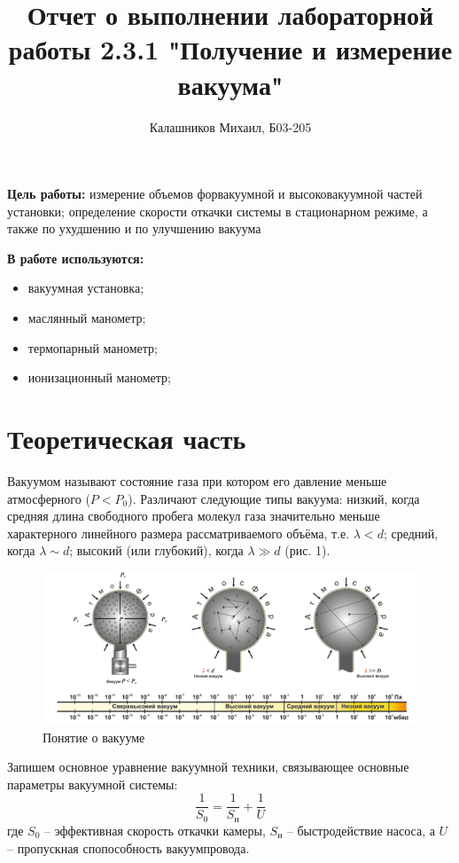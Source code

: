 \documentclass[14pt, a4paper]{report}
\title{\textbf{Отчет о выполнении лабораторной работы 2.3.1 "Получение и измерение вакуума"}}
\author{Калашников Михаил, Б03-205}
\date{}
\begin{document}
\maketitle

\textbf{Цель работы:}
измерение объемов форвакуумной и высоковакуумной частей установки; определение скорости откачки системы в стационарном режиме, а также по ухудшению и по улучшению вакуума
\newline

\textbf{В работе используются:}
\begin{itemize}
\item вакуумная установка;
\item маслянный манометр;
\item термопарный манометр;
\item ионизационный манометр;
\end{itemize}

\section{Теоретическая часть}

Вакуумом называют состояние газа при котором его давление меньше атмосферного ($P<P_0$). Различают следующие типы вакуума: низкий, когда средняя длина свободного пробега молекул газа значительно меньше характерного линейного размера рассматриваемого объёма, т.е. $\lambda<d$; средний, когда $\lambda\sim d$; высокий (или глубокий), когда $\lambda \gg d$ (рис. 1).

\begin{figure}[!ht]
\centering
\includegraphics[scale=0.6]{terma5_02.png}
\caption{Понятие о вакууме}
\end{figure}

Запишем основное уравнение вакуумной техники, связывающее основные параметры вакуумной системы:
\[\frac{1}{S_0}=\frac{1}{S_н}+\frac{1}{U}\]
где $S_0$ -- эффективная скорость откачки камеры, $S_н$ -- быстродействие насоса, а $U$ -- пропускная спопособность вакуумпровода.
\end{document}
